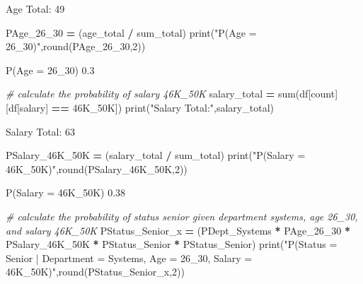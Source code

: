 \documentclass[
]{article}
\newenvironment{Shaded}{\begin{snugshade}}{\end{snugshade}}
\newcommand{\BuiltInTok}[1]{#1}
\newcommand{\CommentTok}[1]{\textcolor[rgb]{0.56,0.35,0.01}{\textit{#1}}}
\newcommand{\DecValTok}[1]{\textcolor[rgb]{0.00,0.00,0.81}{#1}}
\newcommand{\NormalTok}[1]{#1}
\newcommand{\OperatorTok}[1]{\textcolor[rgb]{0.81,0.36,0.00}{\textbf{#1}}}
\newcommand{\StringTok}[1]{\textcolor[rgb]{0.31,0.60,0.02}{#1}}
\begin{document}
Age Total: 49

\begin{Shaded}
\begin{Highlighting}[]
\NormalTok{PAge\_26\_30 }\OperatorTok{=}\NormalTok{ (age\_total }\OperatorTok{/}\NormalTok{ sum\_total)}
\BuiltInTok{print}\NormalTok{(}\StringTok{"P(Age = 26\_30)"}\NormalTok{,}\BuiltInTok{round}\NormalTok{(PAge\_26\_30,}\DecValTok{2}\NormalTok{))}
\end{Highlighting}
\end{Shaded}

P(Age = 26\_30) 0.3

\begin{Shaded}
\begin{Highlighting}[]
\CommentTok{\# calculate the probability of salary 46K\_50K}
\NormalTok{salary\_total }\OperatorTok{=} \BuiltInTok{sum}\NormalTok{(df[}\StringTok{\textquotesingle{}count\textquotesingle{}}\NormalTok{][df[}\StringTok{\textquotesingle{}salary\textquotesingle{}}\NormalTok{] }\OperatorTok{==} \StringTok{\textquotesingle{}46K\_50K\textquotesingle{}}\NormalTok{])}
\BuiltInTok{print}\NormalTok{(}\StringTok{"Salary Total:"}\NormalTok{,salary\_total)}
\end{Highlighting}
\end{Shaded}

Salary Total: 63

\begin{Shaded}
\begin{Highlighting}[]
\NormalTok{PSalary\_46K\_50K }\OperatorTok{=}\NormalTok{ (salary\_total }\OperatorTok{/}\NormalTok{ sum\_total)}
\BuiltInTok{print}\NormalTok{(}\StringTok{"P(Salary = 46K\_50K)"}\NormalTok{,}\BuiltInTok{round}\NormalTok{(PSalary\_46K\_50K,}\DecValTok{2}\NormalTok{))}
\end{Highlighting}
\end{Shaded}

P(Salary = 46K\_50K) 0.38

\begin{Shaded}
\begin{Highlighting}[]
\CommentTok{\# calculate the probability of status senior given department systems, age 26\_30, and salary 46K\_50K}
\NormalTok{PStatus\_Senior\_x }\OperatorTok{=}\NormalTok{ (PDept\_Systems }\OperatorTok{*}\NormalTok{ PAge\_26\_30 }\OperatorTok{*}\NormalTok{ PSalary\_46K\_50K }\OperatorTok{*}\NormalTok{ PStatus\_Senior }\OperatorTok{*}\NormalTok{ PStatus\_Senior)}
\BuiltInTok{print}\NormalTok{(}\StringTok{"P(Status = Senior | Department = Systems, Age = 26\_30, Salary = 46K\_50K)"}\NormalTok{,}\BuiltInTok{round}\NormalTok{(PStatus\_Senior\_x,}\DecValTok{2}\NormalTok{))}
\end{Highlighting}
\end{Shaded}
\end{document}
